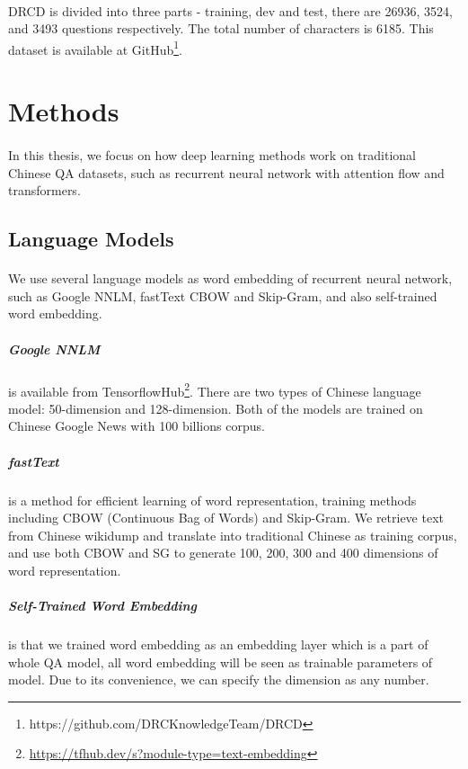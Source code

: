 \documentclass{article}
\begin{document}
\paragraph{}
DRCD is divided into three parts - training, dev and test, there are 26936, 3524, and 3493 questions respectively. The total number of characters is 6185. This dataset is available at GitHub\footnote{\label{drcd_github}https://github.com/DRCKnowledgeTeam/DRCD}.

\section{Methods}
\paragraph{}
In this thesis, we focus on how deep learning methods work on traditional Chinese QA datasets, such as recurrent neural network with attention flow and transformers.

\subsection{Language Models}
\paragraph{}
We use several language models as word embedding of recurrent neural network, such as Google NNLM, fastText\cite{bojanowski2017enriching} CBOW and Skip-Gram, and also self-trained word embedding.

\subparagraph{Google NNLM} is available from TensorflowHub\footnote{\url{https://tfhub.dev/s?module-type=text-embedding}}. There are two types of Chinese language model: 50-dimension and 128-dimension. Both of the models are trained on Chinese Google News with 100 billions corpus.

\subparagraph{fastText} is a method for efficient learning of word representation, training methods including CBOW (Continuous Bag of Words) and Skip-Gram. We retrieve text from Chinese wikidump and translate into traditional Chinese as training corpus, and use both CBOW and SG to generate 100, 200, 300 and 400 dimensions of word representation.

\subparagraph{Self-Trained Word Embedding} is that we trained word embedding as an embedding layer which is a part of whole QA model, all word embedding will be seen as trainable parameters of model. Due to its convenience, we can specify the dimension as any number.
\end{document}
